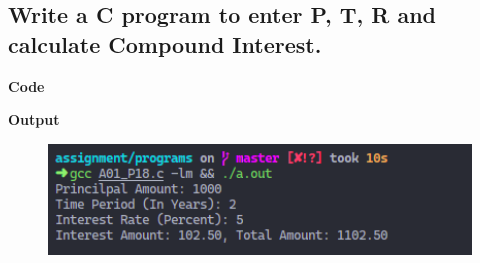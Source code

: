 \documentclass[a4paper]{article}
\begin{document}
\newpage



\subsection{Write a C program to enter P, T, R and calculate Compound Interest.}
\textbf{Code}



\textbf{Output}

\begin{figure}[h]
  \includegraphics[width=12cm]{A01_P18}
\end{figure}

\newpage

\end{document}
